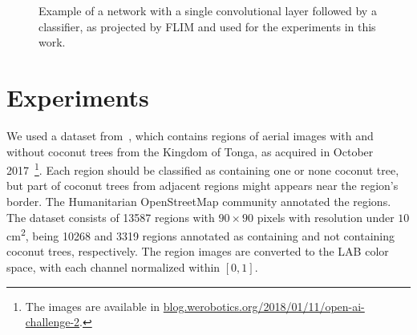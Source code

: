 \documentclass[a4paper,conference]{IEEEtran}
\begin{document}
\begin{figure}
  \begin{center}

  \end{center}
  \caption{Example of a network with a single convolutional layer followed by a classifier, as projected by FLIM and used for the experiments in this work.}
  \label{fig:arch}
\end{figure}

\section{Experiments}

We used a dataset from~\cite{8899005}, which contains regions of aerial images with and without coconut trees from the Kingdom of Tonga, as acquired in October 2017~\footnote{The images are available in \url{blog.werobotics.org/2018/01/11/open-ai-challenge-2}.}. Each region should be classified as containing one or none coconut tree, but part of coconut trees from adjacent regions might appears near the region's border. The Humanitarian OpenStreetMap community annotated the regions. The dataset consists of 13587 regions with $90 \times 90$ pixels with resolution under $10$\si{\square\centi\metre}, being 10268 and 3319 regions annotated as containing and not containing coconut trees, respectively. The region images are converted to the LAB color space, with each channel normalized within $[0,1]$.
\end{document}
